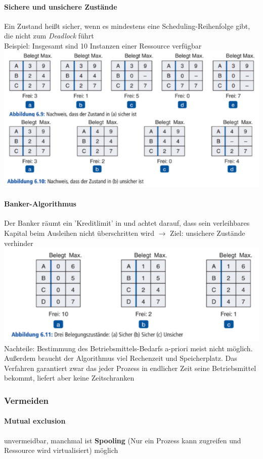 \documentclass[11pt,a4paper,landscape]{article}
\begin{document}
\begin{multicols*}{3}
	\paragraph{Sichere und unsichere Zustände} Ein Zustand heißt sicher, wenn es mindestens eine Scheduling-Reihenfolge gibt, die nicht zum \textit{Deadlock} führt\\
	Beispiel: Insgesamt sind 10 Instanzen einer Ressource verfügbar\\
	\includegraphics[width=0.98\columnwidth]{zustand}
	\paragraph{Banker-Algorithmus} Der Banker räumt ein 'Kreditlimit' in und achtet darauf, dass sein verleihbares Kapital beim Ausleihen nicht überschritten wird $\rightarrow$ Ziel: unsichere Zustände verhinder\\
	\includegraphics[width=0.9\columnwidth]{banker}
	Nachteile: Bestimmung des Betriebsmittels-Bedarfs a-priori meist nicht möglich. Außerdem braucht der Algorithmus viel Rechenzeit und Speicherplatz. Das Verfahren garantiert zwar das jeder Prozess in endlicher Zeit seine Betriebsmittel bekommt, liefert aber keine Zeitschranken
	\subsubsection{Vermeiden}
	\paragraph{Mutual exclusion} unvermeidbar, manchmal ist \textbf{Spooling} (Nur ein Prozess kann zugreifen und Ressource wird virtualisiert) möglich

\end{multicols*}
\end{document}
